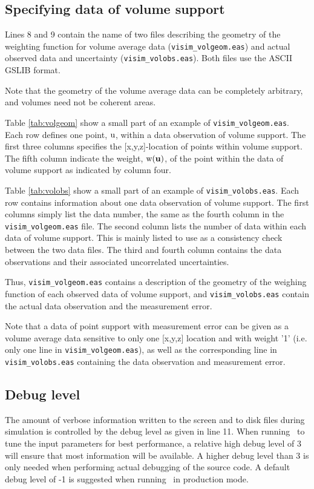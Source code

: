 \documentclass[12t]{article}
\begin{document}
\subsection{Specifying data of volume support}
Lines 8 and 9 contain the name of two files describing the geometry of
the weighting function for volume average data (\texttt{visim\_volgeom.eas}) and actual
observed data and uncertainty (\texttt{visim\_volobs.eas}). Both files
use the ASCII GSLIB format.

Note that the geometry of the volume average data can be completely
arbitrary, and volumes need not be coherent areas.

Table \ref{tab:volgeom} show a small part of an example of \texttt{visim\_volgeom.eas}. Each row defines one point, ${\rm u}$, within a data observation of volume support.
The first three columns specifies the [x,y,z]-location of points within volume support. 
 The fifth column indicate the weight, ${\rm w}({\bf u})$, of the point within the data of volume support as indicated by column four. 

Table \ref{tab:volobs} show a small part of an example of
\texttt{visim\_volobs.eas}. Each row contains information about one
data observation of volume support. The first columns simply list the
data number, the same as the fourth column in the
\texttt{visim\_volgeom.eas} file. The second column lists the number
of data within each data of volume support. This is mainly listed to
use as a consistency check between the two data files. The third and
fourth column contains the data observations and their associated uncorrelated uncertainties.

Thus,  \texttt{visim\_volgeom.eas} contains a description of the geometry of the weighing function of each observed data of volume support, and  \texttt{visim\_volobs.eas} contain the actual data observation and the measurement error.

Note that a data of point support with measurement error can be given as a volume average data sensitive to only one [x,y,z] location and with weight '1' (i.e. only one line in \texttt{visim\_volgeom.eas}), as well as the corresponding line in \texttt{visim\_volobs.eas} containing the data observation and measurement error.  

\subsection{Debug level}
The amount of verbose information written to the screen and to disk
files during simulation is controlled by the debug level as given in
line 11. When running \visimprog~to tune the input parameters for best
performance, a relative high debug level of 3 will ensure that most
information will be available. A higher debug level than 3 is only
needed when performing actual debugging of the source code.
A default debug level of -1 is suggested when running \visimprog~in
production mode.
\end{document}
